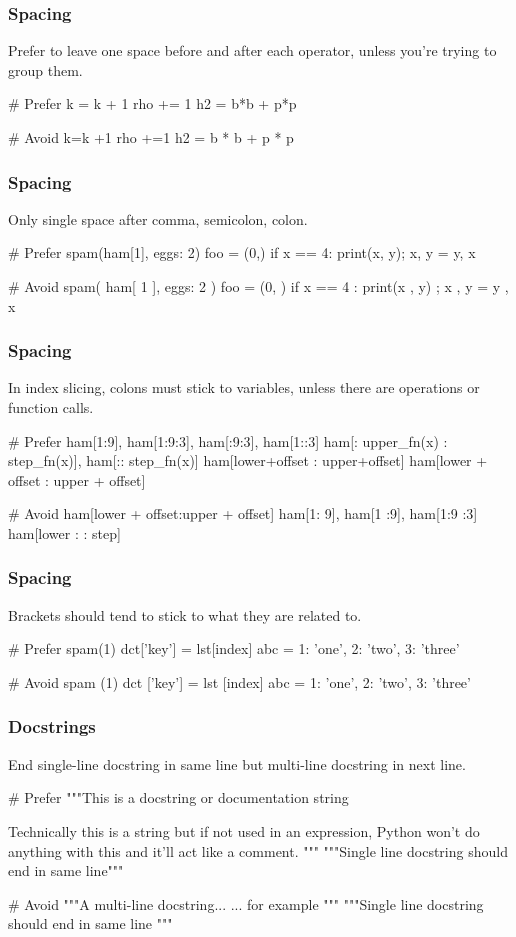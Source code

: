 \documentclass{beamer}
\begin{document}
\begin{frame}[fragile]
\frametitle{Spacing}
Prefer to leave one space before and after each operator, unless you're trying to group them.
\begin{python}
# Prefer
k = k + 1
rho += 1
h2 = b*b + p*p

# Avoid
k=k +1
rho +=1
h2 = b * b + p * p
\end{python}
\end{frame}

\begin{frame}[fragile]
\frametitle{Spacing}
Only single space after comma, semicolon, colon.
\begin{python}
# Prefer
spam(ham[1], {eggs: 2})
foo = (0,)
if x == 4: print(x, y); x, y = y, x

# Avoid
spam( ham[ 1 ], { eggs: 2 } )
foo = (0, )
if x == 4 : print(x , y) ; x , y = y , x
\end{python}
\end{frame}

\begin{frame}[fragile]
\frametitle{Spacing}
In index slicing, colons must stick to variables, unless there are operations or function calls.
\begin{python}
# Prefer
ham[1:9], ham[1:9:3], ham[:9:3], ham[1::3]
ham[: upper_fn(x) : step_fn(x)], ham[:: step_fn(x)]
ham[lower+offset : upper+offset]
ham[lower + offset : upper + offset]

# Avoid
ham[lower + offset:upper + offset]
ham[1: 9], ham[1 :9], ham[1:9 :3]
ham[lower : : step]
\end{python}
\end{frame}

\begin{frame}[fragile]
\frametitle{Spacing}
Brackets should tend to stick to what they are related to.
\begin{python}
# Prefer
spam(1)
dct['key'] = lst[index]
abc = {1: 'one', 2: 'two', 3: 'three'}

# Avoid
spam (1)
dct ['key'] = lst [index]
abc = { 1: 'one', 2: 'two', 3: 'three' }
\end{python}
\end{frame}

\begin{frame}[fragile]
\frametitle{Docstrings}
End single-line docstring in same line but multi-line docstring in next line.
\begin{python}
# Prefer
"""This is a docstring or documentation string

Technically this is a string but if not used in
an expression, Python won't do anything with
this and it'll act like a comment.
"""
"""Single line docstring should end in same line"""

# Avoid
"""A multi-line docstring...
... for example """
"""Single line docstring should end in same line
"""
\end{python}
\end{frame}
\end{document}
